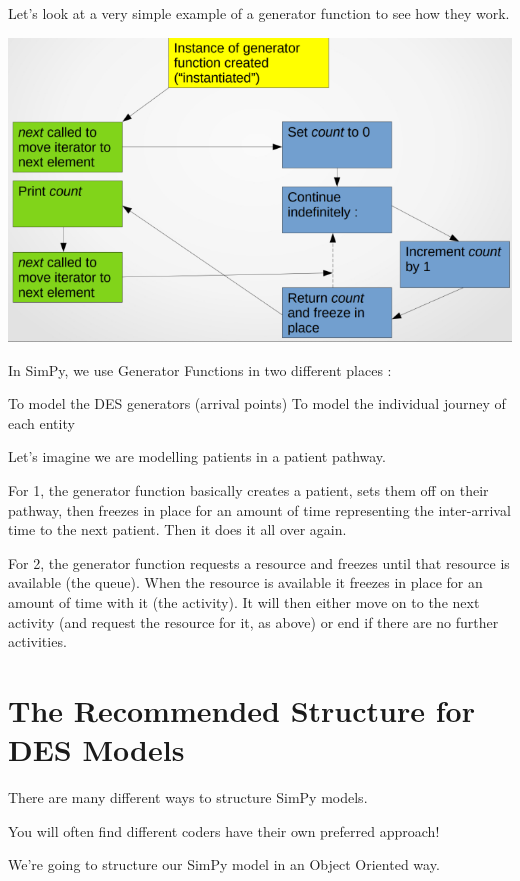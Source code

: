 \documentclass[
  letterpaper,
  DIV=11,
  numbers=noendperiod]{scrreprt}
\begin{document}
Let's look at a very simple example of a generator function to see how
they work.

\includegraphics{images/generator_func_example.png}

In SimPy, we use Generator Functions in two different places :

To model the DES generators (arrival points) To model the individual
journey of each entity

Let's imagine we are modelling patients in a patient pathway.

For 1, the generator function basically creates a patient, sets them off
on their pathway, then freezes in place for an amount of time
representing the inter-arrival time to the next patient. Then it does it
all over again.

For 2, the generator function requests a resource and freezes until that
resource is available (the queue). When the resource is available it
freezes in place for an amount of time with it (the activity). It will
then either move on to the next activity (and request the resource for
it, as above) or end if there are no further activities.

\chapter{The Recommended Structure for DES
Models}\label{the-recommended-structure-for-des-models}

There are many different ways to structure SimPy models.

You will often find different coders have their own preferred approach!

We're going to structure our SimPy model in an Object Oriented way.
\end{document}
